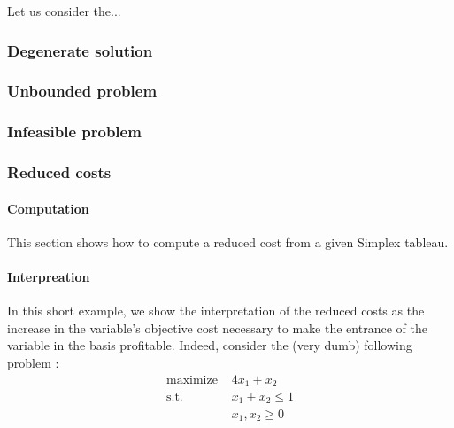 Let us consider the...

\subsubsection{Degenerate solution}
\subsubsection{Unbounded problem}
\subsubsection{Infeasible problem}
\subsubsection{Reduced costs}
\paragraph{Computation}
This section shows how to compute a reduced cost from a given Simplex tableau. 
\paragraph{Interpreation}
In this short example, we show the interpretation of the reduced costs as the increase in the variable's objective cost necessary to make the entrance of the variable in the basis profitable. Indeed, consider the (very dumb) following problem :
\begin{align*}
    \textrm{maximize } & 4x_1 + x_2\\
    \textrm{s.t. } & x_1 + x_2 \le 1\\
    & x_1, x_2\ge 0
\end{align*}

